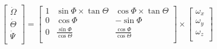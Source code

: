 \begin{gather*}
    \begin{bmatrix}
        \dot{\Omega} \\
        \dot{\Theta} \\
        \dot{\Psi}   \\
    \end{bmatrix}
    =
    \begin{bmatrix}
        1 & \sin{\Phi} \times \tan{\Theta}  & \cos{\Phi} \times \tan{\Theta}  \\
        0 & \cos{\Phi}                      & -\sin{\Phi}                     \\
        0 & \frac{\sin{\Phi}}{\cos{\Theta}} & \frac{\cos{\Phi}}{\cos{\Theta}} \\
    \end{bmatrix}
    \times
    \begin{bmatrix}
        \omega_x \\
        \omega_y \\
        \omega_z \\
    \end{bmatrix}
\end{gather*}